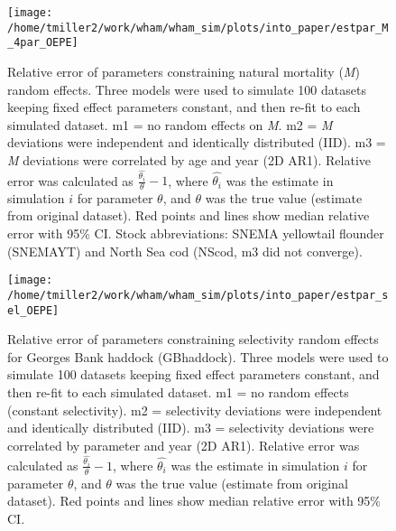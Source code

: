 \documentclass[]{article}
\begin{document}
\begin{figure}

{\centering \texttt{[image: /home/tmiller2/work/wham/wham\_sim/plots/into\_paper/estpar\_M\_4par\_OEPE]} 

}

\caption{Relative error of parameters constraining natural mortality (\textit{M}) random effects. Three models were used to simulate 100 datasets keeping fixed effect parameters constant, and then re-fit to each simulated dataset. m1 = no random effects on \textit{M}. m2 = \textit{M} deviations were independent and identically distributed (IID). m3 = \textit{M} deviations were correlated by age and year (2D AR1). Relative error was calculated as $\frac{\hat{\theta_i}}{\theta} - 1$, where $\hat{\theta_i}$ was the estimate in simulation $i$ for parameter $\theta$, and $\theta$ was the true value (estimate from original dataset). Red points and lines show median relative error with 95\% CI. Stock abbreviations: SNEMA yellowtail flounder (SNEMAYT) and North Sea cod (NScod, m3 did not converge).}\label{fig:estpar-m}
\end{figure}

\pagebreak

\begin{figure}

{\centering \texttt{[image: /home/tmiller2/work/wham/wham\_sim/plots/into\_paper/estpar\_sel\_OEPE]} 

}

\caption{Relative error of parameters constraining selectivity random effects for Georges Bank haddock (GBhaddock). Three models were used to simulate 100 datasets keeping fixed effect parameters constant, and then re-fit to each simulated dataset. m1 = no random effects (constant selectivity). m2 = selectivity deviations were independent and identically distributed (IID). m3 = selectivity deviations were correlated by parameter and year (2D AR1). Relative error was calculated as $\frac{\hat{\theta_i}}{\theta} - 1$, where $\hat{\theta_i}$ was the estimate in simulation $i$ for parameter $\theta$, and $\theta$ was the true value (estimate from original dataset). Red points and lines show median relative error with 95\% CI.}\label{fig:estpar-sel}
\end{figure}

\pagebreak
\end{document}
